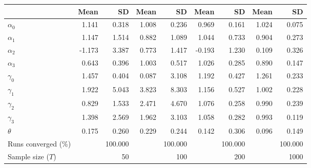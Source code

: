 
\begin{tabular}[t]{lrrrrrrrr}
\toprule
  & Mean & SD & Mean  & SD  & Mean   & SD   & Mean    & SD   \\
\midrule
$\alpha_{0}$ & 1.141 & 0.318 & 1.008 & 0.236 & 0.969 & 0.161 & 1.024 & 0.075\\
$\alpha_{1}$ & 1.147 & 1.514 & 0.882 & 1.089 & 1.044 & 0.733 & 0.904 & 0.273\\
$\alpha_{2}$ & -1.173 & 3.387 & 0.773 & 1.417 & -0.193 & 1.230 & 0.109 & 0.326\\
$\alpha_{3}$ & 0.643 & 0.396 & 1.003 & 0.517 & 1.026 & 0.285 & 0.890 & 0.147\\
$\gamma_{0}$ & 1.457 & 0.404 & 0.087 & 3.108 & 1.192 & 0.427 & 1.261 & 0.233\\
$\gamma_{1}$ & 1.922 & 5.043 & 3.823 & 8.303 & 1.156 & 0.527 & 1.002 & 0.228\\
$\gamma_{2}$ & 0.829 & 1.533 & 2.471 & 4.670 & 1.076 & 0.258 & 0.990 & 0.239\\
$\gamma_{3}$ & 1.398 & 2.569 & 1.962 & 3.103 & 1.058 & 0.282 & 0.993 & 0.119\\
$\theta$ & 0.175 & 0.260 & 0.229 & 0.244 & 0.142 & 0.306 & 0.096 & 0.149\\
Runs converged (\%) &  & 100.000 &  & 100.000 &  & 100.000 &  & 100.000\\
Sample size ($T$) &  & 50 &  & 100 &  & 200 &  & 1000\\
\bottomrule
\end{tabular}
